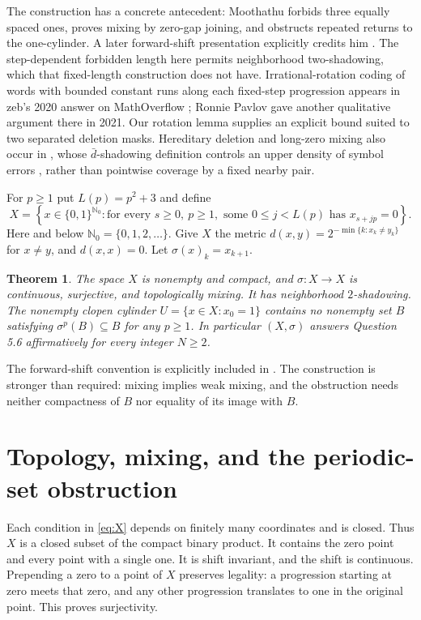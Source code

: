 \documentclass[11pt]{article}
\newtheorem{theorem}{Theorem}
\newcommand{\NN}{\mathbb N_0}
\begin{document}
The construction has a concrete antecedent: Moothathu
\cite[Proposition 3(iv), p.~131]{Moo} forbids three equally spaced
ones, proves mixing by zero-gap joining, and obstructs repeated
returns to the one-cylinder. A later forward-shift presentation
explicitly credits him \cite[Proposition 4.17, p.~19 of v3]{KLOY}.
The step-dependent forbidden length here permits neighborhood
two-shadowing, which that fixed-length construction does not have.
Irrational-rotation coding of words with bounded constant runs along
each fixed-step progression appears in zeb's 2020 answer on
MathOverflow \cite{MO}; Ronnie Pavlov gave another qualitative
argument there in 2021. Our rotation lemma supplies an explicit
bound suited to two separated deletion masks.
Hereditary deletion and long-zero mixing also occur in
\cite[Example 21 and Proposition 22 of v2]{CKKK}, whose
$\bar d$-shadowing definition controls an upper density of symbol
errors \cite[Section 1.5 of v2]{CKKK}, rather than pointwise
coverage by a fixed nearby pair.

For $p\geq1$ put $L(p)=p^2+3$ and define
\begin{equation}\label{eq:X}
 X=\left\{x\in\{0,1\}^{\NN}:
   \text{for every }s\geq0,\ p\geq1,
   \text{ some }0\leq j<L(p)\text{ has }x_{s+jp}=0\right\}.
\end{equation}
Here and below $\NN=\{0,1,2,\ldots\}$. Give $X$ the metric
$d(x,y)=2^{-\min\{k:x_k\ne y_k\}}$ for $x\ne y$, and $d(x,x)=0$.
Let $\sigma(x)_k=x_{k+1}$.

\begin{theorem}\label{thm:main}
The space $X$ is nonempty and compact, and $\sigma:X\to X$ is
continuous, surjective, and topologically mixing. It has neighborhood
$2$-shadowing. The nonempty clopen cylinder
$U=\{x\in X:x_0=1\}$ contains no nonempty set $B$ satisfying
$\sigma^p(B)\subseteq B$ for any $p\geq1$.
In particular $(X,\sigma)$ answers Question 5.6 affirmatively for every
integer $N\geq2$.
\end{theorem}

The forward-shift convention is explicitly included in
\cite[Section 2]{MS}. The construction is stronger than required:
mixing implies weak mixing, and the obstruction needs neither
compactness of $B$ nor equality of its image with $B$.

\section{Topology, mixing, and the periodic-set obstruction}
Each condition in \eqref{eq:X} depends on finitely many coordinates
and is closed. Thus $X$ is a closed subset of the compact binary
product. It contains the zero point and every point with a single
one. It is shift invariant, and the shift is continuous. Prepending
a zero to a point of $X$ preserves legality: a progression starting
at zero meets that zero, and any other progression translates to
one in the original point. This proves surjectivity.
\end{document}
